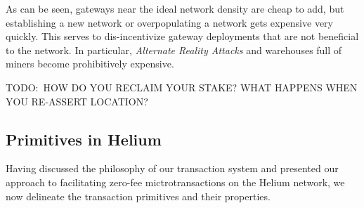 \documentclass[letterpaper,11pt]{article}
\newcommand{\todo}[1]{}
\renewcommand{\todo}[1]{{\color{red} TODO:\ {#1}}}
\begin{document}
As can be seen, gateways near the ideal network density are cheap to add, but establishing a new network or overpopulating a network gets expensive very quickly. This serves to dis-incentivize gateway deployments that are not beneficial to the network. In particular, \emph{Alternate Reality Attacks} and warehouses full of miners become prohibitively expensive.

\todo{HOW DO YOU RECLAIM YOUR STAKE? WHAT HAPPENS WHEN YOU RE-ASSERT LOCATION?}

\subsection{Primitives in Helium} \label{primitives}
Having discussed the philosophy of our transaction system and presented our approach to facilitating zero-fee mictrotransactions on the Helium network, we now delineate the transaction primitives and their properties.
\end{document}
